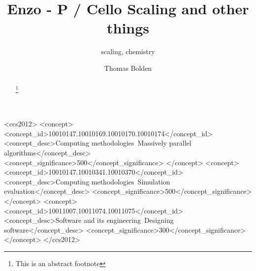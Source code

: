 \documentclass[sigconf]{acmart}
\begin{document}
\title{Enzo - P / Cello Scaling and other things}

\subtitle{scaling, chemistry}

\author{Thomas Bolden}




\begin{abstract}
\lipsum[2]
\footnote{This is an abstract footnote}
\end{abstract}



\begin{CCSXML}
<ccs2012>
<concept>
<concept_id>10010147.10010169.10010170.10010174</concept_id>
<concept_desc>Computing methodologies~Massively parallel algorithms</concept_desc>
<concept_significance>500</concept_significance>
</concept>
<concept>
<concept_id>10010147.10010341.10010370</concept_id>
<concept_desc>Computing methodologies~Simulation evaluation</concept_desc>
<concept_significance>500</concept_significance>
</concept>
<concept>
<concept_id>10011007.10011074.10011075</concept_id>
<concept_desc>Software and its engineering~Designing software</concept_desc>
<concept_significance>300</concept_significance>
</concept>
</ccs2012>
\end{CCSXML}




\maketitle







 
\end{document}
